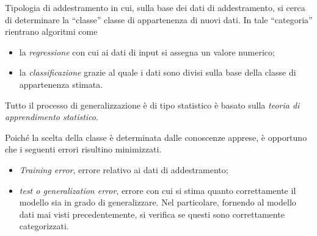 \documentclass{subfiles}
\begin{document}
Tipologia di addestramento in cui, sulla base dei dati di addestramento, si cerca di determinare la ``classe'' classe di appartenenza di nuovi dati.
In tale ``categoria'' rientrano algoritmi come
\begin{itemize}
    \item la \emph{regressione} con cui ai dati di input si assegna un valore numerico;
    \item la \emph{classificazione} grazie al quale i dati sono divisi sulla base della classe di appartenenza stimata.
\end{itemize}

\begin{Remark*}
    Tutto il processo di generalizzazione è di tipo statistico è basato sulla \emph{teoria di apprendimento statistico\footnotemark[2]}.
\end{Remark*}

Poiché la scelta della classe è determinata dalle conoscenze apprese, è opportuno che i seguenti errori risultino minimizzati.
\begin{itemize}
    \item \emph{Training error}, errore relativo ai dati di addestramento;
    \item \emph{test \emph{o} generalization error}, errore con cui si stima quanto correttamente il modello sia in grado di generalizzare.
          Nel particolare, fornendo al modello dati mai visti precedentemente, si verifica se questi sono correttamente categorizzati.
\end{itemize}
\end{document}
